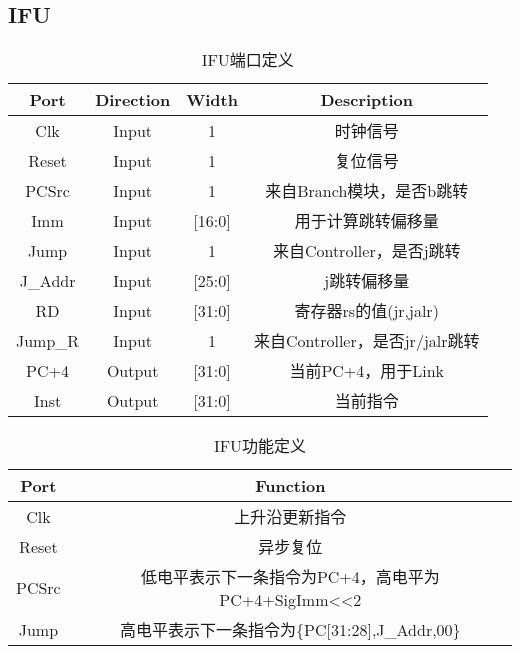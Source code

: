 \documentclass[UTF8]{ctexart}
\begin{document}
\subsection{IFU}
\begin{table}[H]
	\centering
	\begin{threeparttable}
		\caption{IFU端口定义}
		\begin{tabular}{cccc}
			\toprule
			\rowcolor{mypink}
			\textbf{Port} & \textbf{Direction} & \textbf{Width} & \textbf{Description}            \\
			\midrule
			Clk           & Input              & 1              & 时钟信号                        \\
			\midrule
			Reset         & Input              & 1              & 复位信号                        \\
			\midrule
			PCSrc         & Input              & 1              & 来自Branch模块，是否b跳转       \\
			\midrule
			Imm           & Input              & [16:0]         & 用于计算跳转偏移量              \\
			\midrule
			Jump          & Input              & 1              & 来自Controller，是否j跳转       \\
			\midrule
			J\_Addr       & Input              & [25:0]         & j跳转偏移量                     \\
			\midrule
			RD            & Input              & [31:0]         & 寄存器rs的值(jr,jalr)           \\
			\midrule
			Jump\_R       & Input              & 1              & 来自Controller，是否jr/jalr跳转 \\
			\midrule
			PC+4          & Output             & [31:0]         & 当前PC+4，用于Link              \\
			\midrule
			Inst          & Output             & [31:0]         & 当前指令                        \\
			\midrule
		\end{tabular}
	\end{threeparttable}
\end{table}
\begin{table}[H]
	\centering
	\begin{threeparttable}
		\caption{IFU功能定义}
		\begin{tabular}{cc}
			\toprule
			\rowcolor{mypink}
			\textbf{Port} & \textbf{Function}                                  \\
			\midrule
			Clk           & 上升沿更新指令                                     \\
			\midrule
			Reset         & 异步复位                                           \\
			\midrule
			PCSrc         & 低电平表示下一条指令为PC+4，高电平为PC+4+SigImm<<2 \\
			\midrule
			Jump          & 高电平表示下一条指令为\{PC[31:28],J\_Addr,00\}     \\
			\midrule
		\end{tabular}
	\end{threeparttable}
\end{table}
\end{document}
